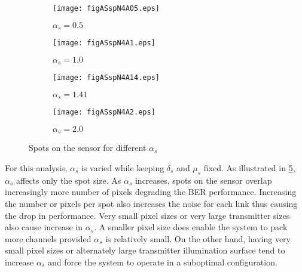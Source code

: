 \begin{figure}[!t]
	\centering
		\begin{subfigure}{0.49\textwidth}
			\centering
			\texttt{[image: figASspN4A05.eps]}
			\label{figASspN4A05}
		\caption{$\alpha_{s}=0.5$}
		\end{subfigure}
		\hfill
		\begin{subfigure}{0.49\textwidth}
			\centering
			\texttt{[image: figASspN4A1.eps]}
			\label{figASspN4A1}
		\caption{$\alpha_{s}=1.0$}
		\end{subfigure}
		\vfill
		\begin{subfigure}{0.49\textwidth}
			\centering
			\texttt{[image: figASspN4A14.eps]}
			\label{figASspN4A14}
		\caption{$\alpha_{s}=1.41$}
		\end{subfigure}
		\hfill
		\begin{subfigure}{0.49\textwidth}
			\centering
			\texttt{[image: figASspN4A2.eps]}
			\label{figASspN4A2}
		\caption{$\alpha_{s}=2.0$}
		\end{subfigure}
	\caption{Spots on the sensor for different $\alpha_{s}$}
	\label{figASSpots}
\end{figure}


For this analysis, $\alpha_{s}$ is varied while keeping $\delta_{s}$ and $\mu_{s}$ fixed. As illustrated in \figurename{ \ref{figASSpots}}, $\alpha_{s}$ affects only the spot size. As $\alpha_{s}$ increases, spots on the sensor overlap increasingly more number of pixels degrading the BER performance. Increasing the number or pixels per spot also increases the noise for each link thus causing the drop in performance. Very small pixel sizes or very large transmitter sizes also cause increase in $\alpha_{s}$. A smaller pixel size does enable the system to pack more channels provided $\alpha_{s}$ is relatively small. On the other hand, having very small pixel sizes or alternately large transmitter illumination surface tend to increase $\alpha_{s}$ and force the system to operate in a suboptimal configuration.

